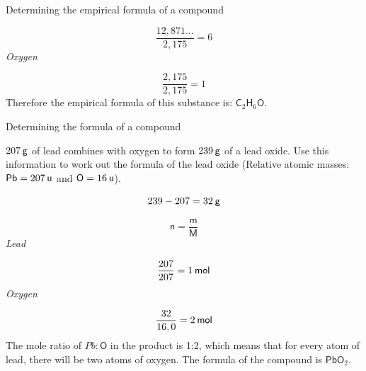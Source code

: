 \begin{wex}{Determining the empirical formula of a compound }
{    \begin{equation*}
    \frac{12,871...}{2,175}=6
      \end{equation*}
      \label{m38712*id281254}
        \textsl{Oxygen}
      \par 
      \label{m38712*id281261}\nopagebreak\noindent{}
        
    \begin{equation*}
    \frac{2,175}{2,175}=1
      \end{equation*}
      \label{m38712*id281292}Therefore the empirical formula of this substance is: ${\mathsf{C}}_{2}{\mathsf{H}}_{6}\mathsf{O}$.\par 
}
    \end{wex}
    \noindent
\label{m38712*secfhsst!!!underscore!!!id1235}\vspace{.5cm} 
      \noindent
      \begin{wex}{Determining the formula of a compound }{
      \label{m38712*probfhsst!!!underscore!!!id1236}
      \label{m38712*id281333}$207\phantom{\rule{2pt}{0ex}}\mathsf{g}$ of lead combines with oxygen to form $239\phantom{\rule{2pt}{0ex}}\mathsf{g}$ of a lead oxide. Use this information to work out the formula of the lead oxide (Relative atomic masses: $\mathsf{Pb}=207\phantom{\rule{2pt}{0ex}}\mathsf{u}$ and $\mathsf{O}=16\phantom{\rule{2pt}{0ex}}\mathsf{u}$).\par 
}
{
      \label{m38712*id281379}\nopagebreak\noindent{}
    \begin{equation*}
    239-207=32\phantom{\rule{2pt}{0ex}}\mathsf{g}
      \end{equation*}
      \label{m38712*id281407}\nopagebreak\noindent{}
        
    \begin{equation*}
    \mathsf{n}=\frac{\mathsf{m}}{\mathsf{M}}
      \end{equation*}
      \label{m38712*id281427}
        \textsl{Lead}
      \par 
      \label{m38712*id281433}\nopagebreak\noindent{}
        
    \begin{equation*}
    \frac{207}{207}=1\phantom{\rule{2pt}{0ex}}\mathsf{mol}
      \end{equation*}
      \label{m38712*id281460}
        \textsl{Oxygen}
      \par 
      \label{m38712*id281467}\nopagebreak\noindent{}
        
    \begin{equation*}
    \frac{32}{16,0}=2\phantom{\rule{2pt}{0ex}}\mathsf{mol}
      \end{equation*}
      \label{m38712*id281498}The mole ratio of $Pb:\mathsf{O}$ in the product is 1:2, which means that for every atom of lead, there will be two atoms of oxygen. The formula of the compound is $\mathsf{PbO}{}_{2}$.\par 
}
    \end{wex}
